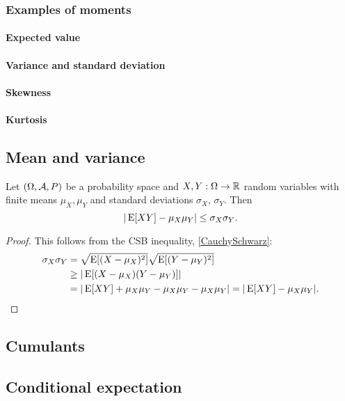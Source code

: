 \subsubsection{Examples of moments}
\paragraph{Expected value}
\paragraph{Variance and standard deviation}
\paragraph{Skewness}
\paragraph{Kurtosis}

\subsection{Mean and variance}

\begin{proposition}
Let $\left( \Omega, \mathcal{A}, P \right)$ be a probability space and $X,Y:\Omega \to \mathbb{R}$ random variables with finite means $\mu_X,\mu_Y$ and standard deviations $\sigma_X$, $\sigma_Y$. Then
\[ |\operatorname{E}[XY] - \mu_X\mu_Y| \leq \sigma_X\sigma_Y. \]
\end{proposition}
\begin{proof}
This follows from the CSB inequality, \ref{CauchySchwarz}:
\begin{align*}
\sigma_X\sigma_Y &= \sqrt{\operatorname{E}[(X-\mu_X)^2]}\sqrt{\operatorname{E}[(Y-\mu_Y)^2]} \\
&\geq |\operatorname{E}[(X-\mu_X)(Y-\mu_Y)]| \\
&= |\operatorname{E}[XY] + \mu_X\mu_Y -\mu_X\mu_Y -\mu_X\mu_Y| = |\operatorname{E}[XY] - \mu_X\mu_Y|.
\end{align*}
\end{proof}

\subsection{Cumulants}

\subsection{Conditional expectation}

